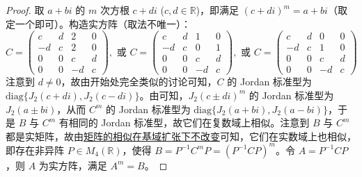 \documentclass[../../main.tex]{subfiles}%
\begin{document}
\begin{proof}
取 $a + bi$ 的 $m$ 次方根 $c + di$ ($c,d\in\mathbb{R}$)，即满足 $(c + di)^m = a + bi$（取定一个即可）。构造实方阵（取法不唯一）：
\[
C = 
\begin{pmatrix}
c & d & 2 & 0 \\
-d & c & 2 & 0 \\
0 & 0 & c & d \\
0 & 0 & -d & c
\end{pmatrix}, \text{ 或 }
C = 
\begin{pmatrix}
c & d & 1 & 0 \\
-d & c & 0 & 1 \\
0 & 0 & c & d \\
0 & 0 & -d & c
\end{pmatrix}, \text{ 或 }
C = 
\begin{pmatrix}
c & d & 0 & 0 \\
-d & c & 1 & 0 \\
0 & 0 & c & d \\
0 & 0 & -d & c
\end{pmatrix}
\]
注意到 $d\neq 0$，故由开始处完全类似的讨论可知，$C$ 的 Jordan 标准型为 $\mathrm{diag}\{J_2(c + di),J_2(c - di)\}$。由可知，$J_2(c\pm di)^m$ 的 Jordan 标准型为 $J_2(a\pm bi)$，从而 $C^m$ 的 Jordan 标准型为 $\mathrm{diag}\{J_2(a + bi),J_2(a - bi)\}$，于是 $B$ 与 $C^m$ 有相同的 Jordan 标准型，故它们在复数域上相似。注意到 $B$ 与 $C^m$ 都是实矩阵，故由\hyperref[corollary:矩阵的相似关系在基域扩张下不变]{矩阵的相似在基域扩张下不改变}可知，它们在实数域上也相似，即存在非异阵 $P\in M_4(\mathbb{R})$，使得 $B = P^{-1}C^mP = (P^{-1}CP)^m$。令 $A = P^{-1}CP$，则 $A$ 为实方阵，满足 $A^m = B$。
\end{proof}
\end{document}
